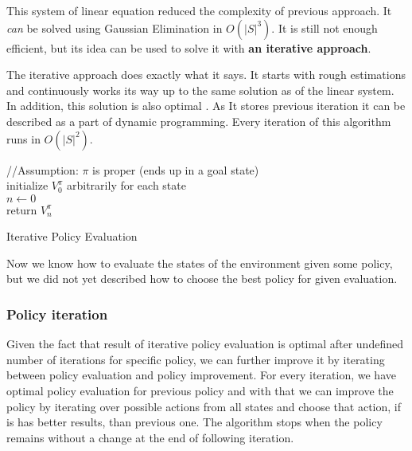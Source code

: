 This system of linear equation reduced the complexity of previous approach. It \textit{can} be solved using Gaussian Elimination in $O(|S|^3)$. It is still not enough efficient, but its idea can be used to solve it with \textbf{an iterative approach}.

The iterative approach does exactly what it says. 
It starts with rough estimations and continuously works its way up to the same solution as of the linear system. In addition, this solution is also optimal \cite{Kolobov2012}. As It stores previous iteration it can be described as a part of dynamic programming. Every iteration of this algorithm runs in $O(|S|^2)$.

\LinesNumbered
\begin{algorithm}[H]
\SetAlgoLined
//Assumption: $\pi$ is proper (ends up in a goal state) \\
initialize $V^{\pi}_0$ arbitrarily for each state \\
$n \xleftarrow{} 0$ \\
return $V^{\pi}_n$
\caption{Iterative Policy Evaluation}
\end{algorithm}

Now we know how to evaluate the states of the environment given some policy, but we did not yet described how to choose the best policy for given evaluation. 

\subsubsection{Policy iteration}
Given the fact that result of iterative policy evaluation is optimal after undefined number of iterations for specific policy, we can further improve it by iterating between policy evaluation and policy improvement.
For every iteration, we have  optimal policy evaluation for previous policy and with that we can improve the policy by iterating over possible actions from all states and choose that action, if is has better results, than previous one. The algorithm stops when the policy remains without a change at the end of following iteration.

